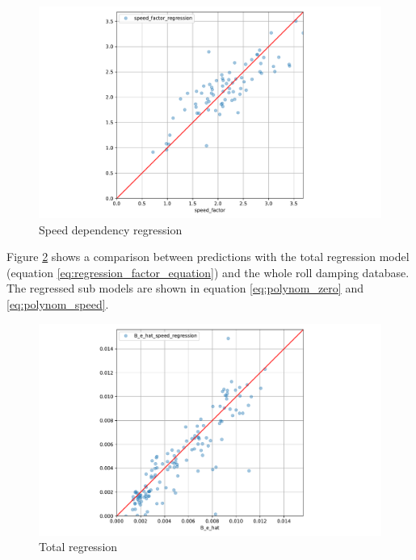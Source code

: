 \begin{figure}[H]
    \centering
    \includegraphics[width=\columnwidth]{figures/B_e_factor_regression.pdf}
    \caption{Speed dependency regression}
    \label{fig:B_e_factor_regression}
\end{figure}

Figure \ref{fig:B_e_factor_regression_total} shows a comparison between predictions with the total regression model (equation \ref{eq:regression_factor_equation}) and the whole roll damping database. The regressed sub models are shown in equation \ref{eq:polynom_zero} and \ref{eq:polynom_speed}.

\begin{figure}[H]
    \centering
    \includegraphics[width=\columnwidth]{figures/B_e_factor_regression_total.pdf}
    \caption{Total regression}
    \label{fig:B_e_factor_regression_total}
\end{figure}




